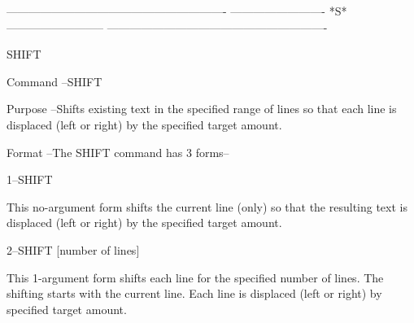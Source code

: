  
 
 
 
 
 
 
 
 
 
 
 
 
 
 
 
 
 
 
 
 
 
 
 
 
 
 
 
 
 
 
 
 
 
 
 
 
 
 
 
 
 
 
 
 
 
 
 
 
 
 
 
 
 
 
 
 
 
 
 
 
 
 
 
----------------------------------------------------------
-------------------------  *S*  --------------------------
----------------------------------------------------------
 
SHIFT
 
Command --SHIFT
 
Purpose --Shifts existing text in the specified range
          of lines so that each line is displaced
          (left or right) by the specified target
          amount.
 
Format  --The SHIFT command has 3 forms--
 
       1--SHIFT
 
          This no-argument form shifts the current
          line (only) so that the resulting text
          is displaced (left or right) by
          the specified target amount.
 
       2--SHIFT     [number of lines]
 
          This 1-argument form shifts each line
          for the specified number of lines.  The
          shifting starts with the current line.
          Each line is displaced (left or right) by
          specified target amount.
 
